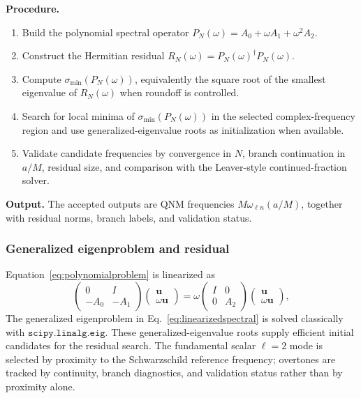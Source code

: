 ﻿\documentclass[12pt,a4paper]{article}
\begin{document}
\textbf{Procedure.}
\begin{enumerate}
\item Build the polynomial spectral operator \(P_N(\omega)=A_0+\omega A_1+\omega^2A_2\).
\item Construct the Hermitian residual \(R_N(\omega)=P_N(\omega)^\dagger P_N(\omega)\).
\item Compute \(\sigma_{\min}(P_N(\omega))\), equivalently the square root of the smallest eigenvalue of \(R_N(\omega)\) when roundoff is controlled.
\item Search for local minima of \(\sigma_{\min}(P_N(\omega))\) in the selected complex-frequency region and use generalized-eigenvalue roots as initialization when available.
\item Validate candidate frequencies by convergence in \(N\), branch continuation in \(a/M\), residual size, and comparison with the Leaver-style continued-fraction solver.
\end{enumerate}

\textbf{Output.} The accepted outputs are QNM frequencies \(M\omega_{\ell n}(a/M)\), together with residual norms, branch labels, and validation status.

\subsubsection{Generalized eigenproblem and residual}

Equation~\eqref{eq:polynomialproblem} is linearized as
\begin{equation}
\begin{pmatrix}
0&I\\
-A_0&-A_1
\end{pmatrix}
\begin{pmatrix}
\bm{u}\\
\omega\bm{u}
\end{pmatrix}
=
\omega
\begin{pmatrix}
I&0\\
0&A_2
\end{pmatrix}
\begin{pmatrix}
\bm{u}\\
\omega\bm{u}
\end{pmatrix},
\label{eq:linearizedspectral}
\end{equation}
The generalized eigenproblem in Eq.~\eqref{eq:linearizedspectral} is solved classically with \(\texttt{scipy.linalg.eig}\). These generalized-eigenvalue roots supply efficient initial candidates for the residual search. The fundamental scalar \(\ell=2\) mode is selected by proximity to the Schwarzschild reference frequency; overtones are tracked by continuity, branch diagnostics, and validation status rather than by proximity alone.
\end{document}
